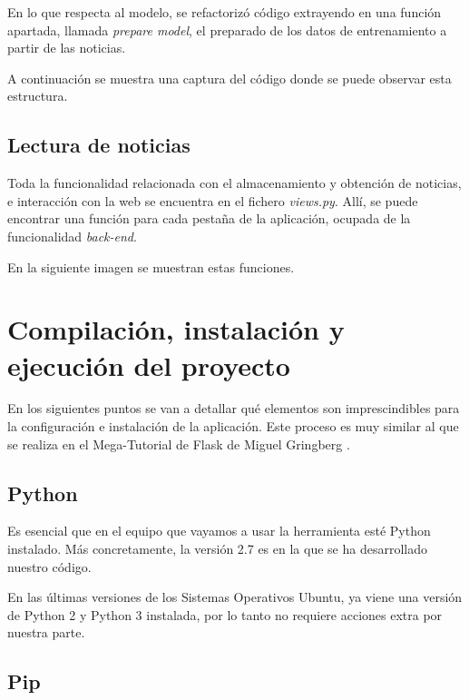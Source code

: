 En lo que respecta al modelo, se refactorizó código extrayendo en una función apartada, llamada \emph{prepare model}, el preparado de los datos de entrenamiento a partir de las noticias.

A continuación se muestra una captura del código donde se puede observar esta estructura.


\subsection{Lectura de noticias}

Toda la funcionalidad relacionada con el almacenamiento y obtención de noticias, e interacción con la web se encuentra en el fichero \emph{views.py}. Allí, se puede encontrar una función para cada pestaña de la aplicación, ocupada de la funcionalidad \emph{back-end}. 

En la siguiente imagen se muestran estas funciones.


\section{Compilación, instalación y ejecución del proyecto}

En los siguientes puntos se van a detallar qué elementos son imprescindibles para la configuración e instalación de la aplicación. Este proceso es muy similar al que se realiza en el Mega-Tutorial de Flask de Miguel Gringberg \cite{flaskmegatutorial}.

\subsection{Python}
Es esencial que en el equipo que vayamos a usar la herramienta esté Python instalado. Más concretamente, la versión 2.7 es en la que se ha desarrollado nuestro código.

En las últimas versiones de los Sistemas Operativos Ubuntu, ya viene una versión de Python 2 y Python 3 instalada, por lo tanto no requiere acciones extra por nuestra parte.

\subsection{Pip}

